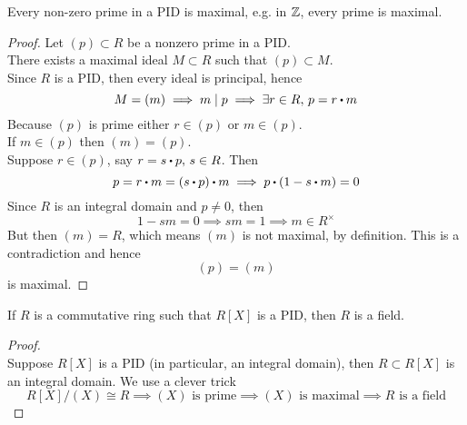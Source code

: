\documentclass[../Main.tex]{subfiles}
\begin{document}
\begin{thm}[title = Nonzero primes ideals are maximal in PID]
	Every non-zero prime in a PID is maximal, e.g. in $\mathbb{Z}$, every prime is maximal.
\end{thm}
\begin{proof}
	Let $(p)\subset R$ be a nonzero prime in a PID.\\
	There exists a maximal ideal $M\subset R $ such that $(p)\subset M$.\\
	Since $R$ is a PID, then every ideal is principal, hence
	\[M=(m) \implies m\mid p \implies \exists r\in R, \, p=r\rdot m\]
	Because $(p)$ is prime either $r\in (p)$ or $m \in (p)$.\\
	If $m\in (p)$ then $(m)=(p)$. \\
	Suppose $r\in (p)$, say $r=s\rdot p,\, s\in R$. Then 
	\[p=r\rdot m=(s\rdot p)\rdot m \implies p\rdot (1-s\rdot m)=0\]
	Since $R$ is an integral domain and $p\ne 0$, then 
	\[1-sm=0\implies sm =1 \implies  m\in R^\times\]
	But then $(m) = R$, which means $(m)$ is not maximal, by definition. This is a contradiction and hence 
	\[(p)=(m)\]
	is maximal.
\end{proof}
\begin{thm}[title = If \texorpdfstring{$R[X]$}{R[X]} is PID then \texorpdfstring{$R$}{R} is field]
	If $R$ is a commutative ring such that $R[X]$ is a PID, then $R$ is a field.
\end{thm}
\begin{proof}~\\
	Suppose $R[X]$ is a PID (in particular, an integral domain), then $R\subset R[X]$ is an integral domain. We use a clever trick
	\[R[X]/(X) \cong R \implies (X) \text{ is prime} \implies (X) \text{ is maximal} \implies R \text{ is a field}\]
\end{proof}
\end{document}
